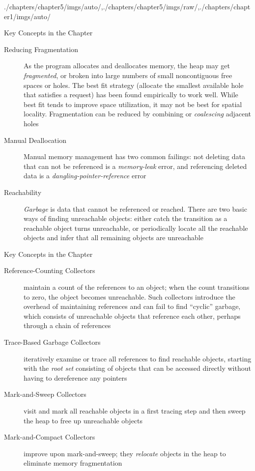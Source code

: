 \begin{graphicspathcontext}{{./chapters/chapter5/imgs/auto/},{./chapters/chapter5/imgs/raw/},{./chapters/chapter1/imgs/auto/}}
\begin{bibunit}[apalike]
\begin{frame}{{Key Concepts} in the Chapter \insertcontinuationtext}
	\begin{description}
		\item[Reducing Fragmentation] As the program allocates and deallocates memory, the heap may get \emph{fragmented}, or broken into large numbers of small noncontiguous free spaces or holes. The best fit strategy (allocate the smallest available hole that satisfies a request) has been found empirically to work well. While best fit tends to improve space utilization, it may not be best for spatial locality. Fragmentation can be reduced by combining or \emph{coalescing} adjacent holes
		\item[Manual Deallocation] Manual memory management has two common failings: not deleting data that can not be referenced is a \emph{memory-leak} error, and referencing deleted data is a \emph{dangling-pointer-reference} error
		\item[Reachability] \emph{Garbage} is data that cannot be referenced or reached. There are two basic ways of finding unreachable objects: either catch the transition as a reachable object turns unreachable, or periodically locate all the reachable objects and infer that all remaining objects are unreachable
	\end{description}
\end{frame}

\begin{frame}{{Key Concepts} in the Chapter \insertcontinuationtext}
	\begin{description}
		\item[Reference-Counting Collectors] maintain a count of the references to an object; when the count transitions to zero, the object becomes unreachable. Such collectors introduce the overhead of maintaining references and can fail to find ``cyclic'' garbage, which consists of unreachable objects that reference each other, perhaps through a chain of references
		\item[Trace-Based Garbage Collectors] iteratively examine or trace all references to find reachable objects, starting with the \emph{root set} consisting of objects that can be accessed directly without having to dereference any pointers
		\item[Mark-and-Sweep Collectors] visit and mark all reachable objects in a first tracing step and then sweep the heap to free up unreachable objects
		\item[Mark-and-Compact Collectors] improve upon mark-and-sweep; they \emph{relocate} objects in the heap to eliminate memory fragmentation
	\end{description}
\end{frame}


\end{bibunit}
\end{graphicspathcontext}
